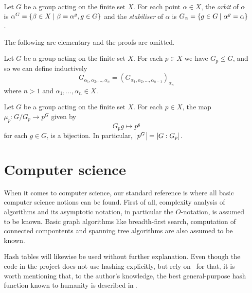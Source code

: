 \begin{deff}
Let $G$ be a group acting on the finite set $X$. For each point
$\alpha \in X$, the \emph{orbit} of $\alpha$ is $\alpha^G = \left\lbrace \beta
\in X \mid \beta = \alpha^g, g \in G \right\rbrace$ and the \emph{stabiliser} of
$\alpha$ is $G_{\alpha} = \left\lbrace g \in G \mid \alpha^g = \alpha \right\rbrace$.
\end{deff}

The following are elementary and the proofs are omitted.
\begin{pr}
Let $G$ be a group acting on the finite set $X$. For each $p \in X$ we have $G_p \leq G$, and so we can define inductively 
\begin{equation}
G_{\alpha_1, \alpha_2, \dotsc, \alpha_n} = (G_{\alpha_1, \alpha_2, \dotsc, \alpha_{n - 1}})_{\alpha_n}
\end{equation}
where $n > 1$ and $\alpha_1, \dotsc, \alpha_n \in X$.
\end{pr}

\begin{pr} \label{thm_orbit_stab}
Let $G$ be a group acting on the finite set $X$. For each $p \in X$, the map $\mu_p : G / G_p \to p^G$ given by
\begin{equation}
G_p g \mapsto p^g
\end{equation}
for each $g \in G$, is a bijection. In particular, $\left\lvert p^G \right\rvert = [G : G_p]$.
\end{pr}

\section{Computer science}
When it comes to computer science, our standard reference is
\cite{clr90} where all basic computer science notions can be
found. First of all, complexity analysis of algorithms and its
asymptotic notation, in particular the $O$-notation, is assumed to be
known. Basic graph algorithms like breadth-first search, computation
of connected compontents and spanning tree algorithms are also assumed to be known.

Hash tables will likewise be used without further explanation. Even
though the code in the project does not use hashing explicitly, but
rely on \GAP~for that, it is worth mentioning that, to the author's
knowledge, the best general-purpose hash function known to humanity is
described in \cite{jenkins97}.
